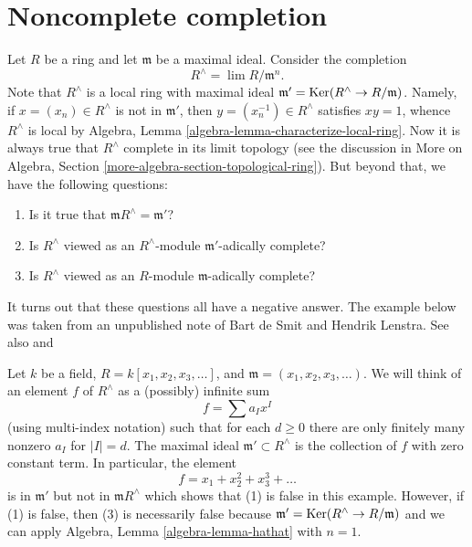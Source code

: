 \section{Noncomplete completion}
\label{section-noncomplete-completion}

\noindent
Let $R$ be a ring and let $\mathfrak m$ be a maximal ideal. Consider the
completion
$$
R^\wedge = \lim R/\mathfrak m^n.
$$
Note that $R^\wedge$ is a local ring with maximal ideal
$\mathfrak m' = \mathop{\mathrm{Ker}}(R^\wedge \to R/\mathfrak m)$.
Namely, if $x = (x_n) \in R^\wedge$ is not in $\mathfrak m'$, then
$y = (x_n^{-1}) \in R^\wedge$ satisfies $xy = 1$, whence $R^\wedge$ is local by
Algebra, Lemma \ref{algebra-lemma-characterize-local-ring}. Now it is
always true that $R^\wedge$ complete in its limit topology (see the
discussion in
More on Algebra, Section \ref{more-algebra-section-topological-ring}).
But beyond that, we have the following questions:
\begin{enumerate}
\item Is it true that $\mathfrak m R^\wedge = \mathfrak m'$?
\item Is $R^\wedge$ viewed as an $R^\wedge$-module $\mathfrak m'$-adically
complete?
\item Is $R^\wedge$ viewed as an $R$-module $\mathfrak m$-adically complete?
\end{enumerate}
It turns out that these questions all have a negative answer.
The example below was taken from an unpublished note of
Bart de Smit and Hendrik Lenstra. See also
\cite[Exercise III.2.12]{Bourbaki-CA} and
\cite[Example 1.8]{Yekutieli}

\medskip\noindent
Let $k$ be a field, $R = k[x_1, x_2, x_3, \ldots]$, and
$\mathfrak m = (x_1, x_2, x_3, \ldots)$.
We will think of an element $f$ of $R^\wedge$ as a (possibly) infinite sum
$$
f = \sum a_I x^I
$$
(using multi-index notation) such that for each $d \geq 0$ there
are only finitely many nonzero $a_I$ for $|I| = d$. The maximal
ideal $\mathfrak m' \subset R^\wedge$ is the collection of $f$ with
zero constant term. In particular, the element
$$
f = x_1 + x_2^2 + x_3^3 + \ldots
$$
is in $\mathfrak m'$ but not in $\mathfrak m R^\wedge$ which
shows that (1) is false in this example. However, if (1) is
false, then (3) is necessarily false because
$\mathfrak m' = \mathop{\mathrm{Ker}}(R^\wedge \to R/\mathfrak m)$
and we can apply
Algebra, Lemma \ref{algebra-lemma-hathat} with $n = 1$.

